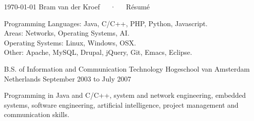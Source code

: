 \documentclass[11pt, letterpaper]{awesome-cv}
\begin{document}
\makecvheader

\makecvfooter
  {\today}
  {Bram van der Kroef~~~·~~~Résumé}
  {\thepage}



  \cvparagraph
  Programming Languages: Java, C/C++, PHP, Python, Javascript.\\
  Areas: Networks, Operating Systems, AI.\\
  Operating Systems: Linux, Windows, OSX.\\
  Other: Apache, MySQL, Drupal, jQuery, Git, Emacs, Eclipse.\\



  \begin{cventries}

    \cventry
        {B.S. of Information and Communication Technology} %
        {Hogeschool van Amsterdam} %
        {Netherlands} %
        {September 2003 to July 2007} %
        {
          \begin{cvitems} %
          \item {Programming in Java and C/C++, system and network engineering,
            embedded systems, software engineering, artificial intelligence,
            project management and communication skills.}
          \end{cvitems}
        }

  \end{cventries}


\end{document}

